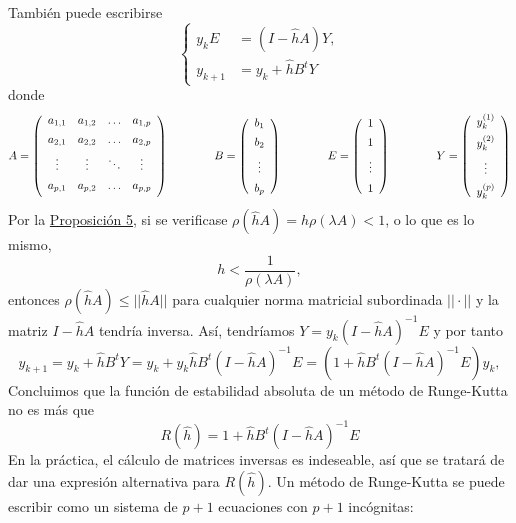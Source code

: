 \documentclass[11pt]{report}
\theoremstyle{mytheorem}
\theoremstyle{mydefinition}
\theoremstyle{myexample}
\begin{document}
También puede escribirse
\[\left\{\begin{alignedat}{1}
    y_kE&=(I-\hat{h}A)Y, \\
    y_{k+1} &= y_k+\hat{h}B^tY
\end{alignedat}\right.\]
donde
\[A = \left( \begin{array}{cccc}
    a_{1,1} & a_{1,2} & \mathellipsis & a_{1,p} \\[5pt]
    a_{2,1} & a_{2,2} & \mathellipsis & a_{2,p} \\[5pt]
    \vdots & \vdots & \ddots & \vdots \\[5pt]
    a_{p,1} & a_{p,2} & \mathellipsis & a_{p,p} \\[5pt]
\end{array} \right) \qquad \qquad B = \left( \begin{array}{c}
b_1 \\[5pt]
b_2 \\[5pt]
\vdots \\[5pt]
b_p
\end{array} \right) \qquad \qquad E = \left( \begin{array}{c}
    1 \\[5pt]
    1 \\[5pt]
    \vdots \\[5pt]
    1
\end{array} \right) \qquad \qquad Y = \left( \begin{array}{c}
y_k^{(1)} \\[5pt]
y_k^{(2)} \\[5pt]
\vdots \\[5pt]
y_k^{(p)}
\end{array} \right) \]
Por la \hyperref[prop5]{\color{gray}Proposición 5}, si se verificase $\rho(\hat{h}A) = h\rho(\lambda A) < 1$, o lo que es lo mismo,
\[h <\frac{1}{\rho(\lambda A)},\]
entonces $\rho(\hat{h}A) \leq ||\hat{h}A||$ para cualquier norma matricial subordinada $||\cdot||$ y la matriz $I-\hat{h}A$ tendría inversa. Así, tendríamos $Y = y_k(I-\hat{h}A)^{-1}E$ y por tanto
\[    y_{k+1} =y_k+\hat{h}B^tY = y_k+y_k\hat{h}B^t(I-\hat{h}A)^{-1}E = \left(1+\hat{h}B^t(I-\hat{h}A)^{-1}E\right)y_k,\]
Concluimos que la función de estabilidad absoluta de un método de Runge-Kutta no es más que
\[R(\hat{h}) = 1+\hat{h}B^t(I-\hat{h}A)^{-1}E\]
En la práctica, el cálculo de matrices inversas es indeseable, así que se tratará de dar una expresión alternativa para $R(\hat{h})$. Un método de Runge-Kutta se puede escribir como un sistema de $p+1$ ecuaciones con $p+1$ incógnitas:
\end{document}
